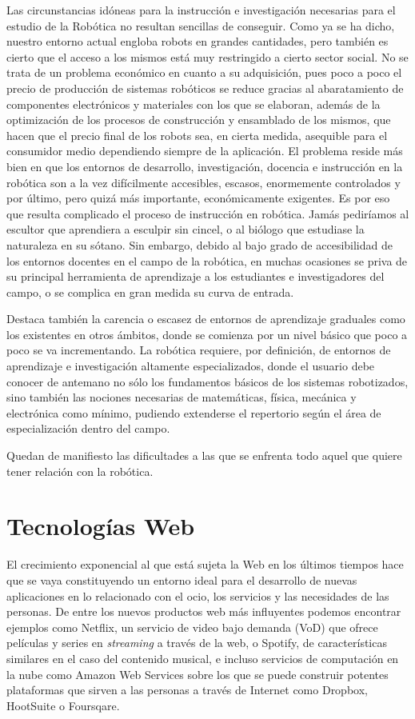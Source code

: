 Las circunstancias idóneas para la instrucción e investigación necesarias para el estudio de la Robótica no resultan sencillas de conseguir. Como ya se ha dicho, nuestro entorno actual engloba robots en grandes cantidades, pero también es cierto que el acceso a los mismos está muy restringido a cierto sector social. No se trata de un problema económico en cuanto a su adquisición, pues poco a poco el precio de producción de sistemas robóticos se reduce gracias al abaratamiento de componentes electrónicos y materiales con los que se elaboran, además de la optimización de los procesos de construcción y ensamblado de los mismos, que hacen que el precio final de los robots sea, en cierta medida, asequible para el consumidor medio dependiendo siempre de la aplicación. El problema reside más bien en que los entornos de desarrollo, investigación, docencia e instrucción en la robótica son a la vez difícilmente accesibles, escasos, enormemente controlados y por último, pero quizá más importante, económicamente exigentes. Es por eso que resulta complicado el proceso de instrucción en robótica. Jamás pediríamos al escultor que aprendiera a esculpir sin cincel, o al biólogo que estudiase la naturaleza en su sótano. Sin embargo, debido al bajo grado de accesibilidad de los entornos docentes en el campo de la robótica, en muchas ocasiones se priva de su principal herramienta de aprendizaje a los estudiantes e investigadores del campo, o se complica en gran medida su curva de entrada.

Destaca también la carencia o escasez de entornos de aprendizaje graduales como los existentes en otros ámbitos, donde se comienza por un nivel básico que poco a poco se va incrementando. La robótica requiere, por definición, de entornos de aprendizaje e investigación altamente especializados, donde el usuario debe conocer de antemano no sólo los fundamentos básicos de los sistemas robotizados, sino también las nociones necesarias de matemáticas, física, mecánica y electrónica como mínimo, pudiendo extenderse el repertorio según el área de especialización dentro del campo.

Quedan de manifiesto las dificultades a las que se enfrenta todo aquel que quiere tener relación con la robótica.

\section{Tecnologías Web}

El crecimiento exponencial al que está sujeta la Web en los últimos tiempos hace que se vaya constituyendo un entorno ideal para el desarrollo de nuevas aplicaciones en lo relacionado con el ocio, los servicios y las necesidades de las personas. De entre los nuevos productos web más influyentes podemos encontrar ejemplos como Netflix, un servicio de video bajo demanda (VoD) que ofrece películas y series en \textit{streaming} a través de la web, o Spotify, de características similares en el caso del contenido musical, e incluso servicios de computación en la nube como Amazon Web Services sobre los que se puede construir potentes plataformas que sirven a las personas a través de Internet como Dropbox, HootSuite o Foursqare.

